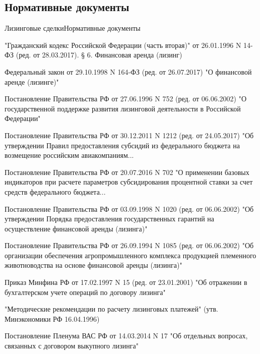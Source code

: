 \documentclass[_Banking_p3.tex]{subfiles}
\begin{document}

\subsection{Нормативные документы}
\begin{frame}[allowframebreaks]{Лизинговые сделки}{Нормативные документы}
  \begin{thebibliography}{10}
  
  \beamertemplatearticlebibitems

"Гражданский кодекс Российской Федерации (часть вторая)" от 26.01.1996 N 14-ФЗ (ред. от 28.03.2017). § 6. Финансовая аренда (лизинг)

Федеральный закон от 29.10.1998 N 164-ФЗ (ред. от 26.07.2017) "О финансовой аренде (лизинге)"

\pagebreak

Постановление Правительства РФ от 27.06.1996 N 752 (ред. от 06.06.2002) "О государственной поддержке развития лизинговой деятельности в Российской Федерации"


Постановление Правительства РФ от 30.12.2011 N 1212 (ред. от 24.05.2017) "Об утверждении Правил предоставления субсидий из федерального бюджета на возмещение российским авиакомпаниям...

\pagebreak

Постановление Правительства РФ от 20.07.2016 N 702 "О применении базовых индикаторов при расчете параметров субсидирования процентной ставки за счет средств федерального бюджета...


Постановление Правительства РФ от 03.09.1998 N 1020 (ред. от 06.06.2002) "Об утверждении Порядка предоставления государственных гарантий на осуществление финансовой аренды (лизинга)"

\pagebreak

Постановление Правительства РФ от 26.09.1994 N 1085 (ред. от 06.06.2002) "Об организации обеспечения агропромышленного комплекса продукцией племенного животноводства на основе финансовой аренды (лизинга)"

Приказ Минфина РФ от 17.02.1997 N 15 (ред. от 23.01.2001) "Об отражении в бухгалтерском учете операций по договору лизинга"

\pagebreak

"Методические рекомендации по расчету лизинговых платежей" (утв. Минэкономики РФ 16.04.1996)

Постановление Пленума ВАС РФ от 14.03.2014 N 17 "Об отдельных вопросах, связанных с договором выкупного лизинга"

  \end{thebibliography}

\end{frame}
\end{document}
